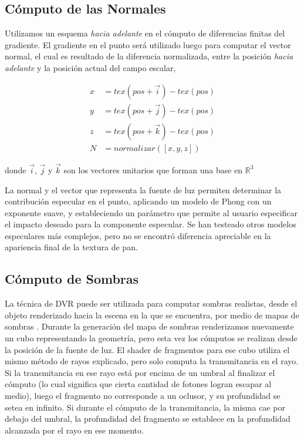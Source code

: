 \subsection{Cómputo de las Normales}
Utilizamos un esquema {\em hacia adelante} en el cómputo de diferencias finitas del gradiente.
El gradiente en el punto será utilizado luego para computar el vector normal, el cual es resultado de la diferencia normalizada, entre la posición {\em hacia adelante} y la posición actual del campo escalar,


\begin{equation}
\begin{aligned}
x &= tex(pos+\vec{i}) - tex(pos)\\
y &= tex(pos+\vec{j}) - tex(pos)\\
z &= tex(pos+\vec{k}) - tex(pos) \\
N &= normalizar([x,y,z])
\end{aligned}
\end{equation}

\noindent donde $\vec{i}$, $\vec{j}$ y $\vec{k}$ son los vectores unitarios que forman una base en $\mathbb{R}^{3}$

La normal y el vector que representa la fuente de luz permiten determinar la contribución especular en el punto, aplicando un modelo de Phong con un exponente suave, y estableciendo un parámetro que permite al usuario especificar el impacto deseado para la componente especular.
Se han testeado otros modelos especulares más complejos, pero no se encontró diferencia apreciable en la apariencia final de la textura de pan.

\subsection{Cómputo de Sombras}
La técnica de DVR puede ser utilizada para computar sombras realistas, desde el objeto renderizado hacia la escena en la que se encuentra, por medio de mapas de sombras \cite{Williams1978}.
Durante la generación del mapa de sombras renderizamos nuevamente un cubo representando la geometría, pero esta vez los cómputos se realizan desde la posición de la fuente de luz.
El shader de fragmentos para ese cubo utiliza el mismo método de rayos explicado, pero solo computa la transmitancia en el rayo.
Si la transmitancia en ese rayo está por encima de un umbral al finalizar el cómputo (lo cual significa que cierta cantidad de fotones logran escapar al medio), luego el fragmento no corresponde a un oclusor, y su profundidad se setea en infinito.
Si durante el cómputo de la transmitancia, la misma cae por debajo del umbral, la profundidad del fragmento se establece en la profundidad alcanzada por el rayo en ese momento.

